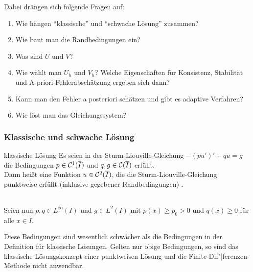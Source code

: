 \begin{Bem}
    Dabei drängen sich folgende Fragen auf:
    \begin{enumerate}
        \item
        Wie hängen "`klassische"' und "`schwache Lösung"' zusammen?

        \item
        Wie baut man die Randbedingungen ein?

        \item
        Was sind $U$ und $V$?

        \item
        Wie wählt man $U_h$ und $V_h$?
        Welche Eigenschaften für Konsistenz, Stabilität und
        A-priori-Fehlerabschätzung ergeben sich dann?

        \item
        Kann man den Fehler a posteriori schätzen und gibt es
        adaptive Verfahren?

        \item
        Wie löst man das Gleichungssystem?
    \end{enumerate}
\end{Bem}

\pagebreak

\subsubsection{%
    Klassische und schwache Lösung%
}

\begin{Def}{klassische Lösung}
    Es seien in der Sturm-Liouville-Gleichung $-(pu')' + qu = g$
    die Bedingungen $p \in \mathcal{C}^1(\overline{I})$ und
    $q, g \in \mathcal{C}(\overline{I})$ erfüllt.\\
    Dann heißt eine Funktion $u \in \mathcal{C}^2(\overline{I})$, die die
    Sturm-Liouville-Gleichung punktweise erfüllt
    (inklusive gegebener Randbedingungen)
    .
\end{Def}

\begin{Bem}\\
    Seien nun $p, q \in L^\infty(I)$ und $g \in L^2(I)$ mit
    $p(x) \ge p_0 > 0$ und $q(x) \ge 0$ für alle $x \in \overline{I}$.
\end{Bem}

\begin{Bem}
    Diese Bedingungen sind wesentlich schwächer als die Bedingungen
    in der Definition für klassische Lösungen.
    Gelten nur obige Bedingungen, so sind das klassische Lösungskonzept einer
    punktweisen Lösung und die Finite-Dif"|ferenzen-Methode nicht anwendbar.
\end{Bem}

